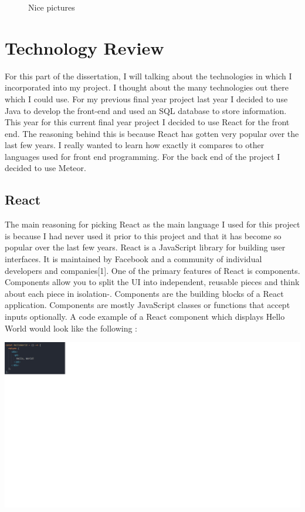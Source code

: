 \begin{figure}
  \centering
  \caption{Nice pictures}
  \label{tikz:graphs}
\end{figure}


\chapter{Technology Review}
For this part of the dissertation, I will talking about the technologies in which I incorporated into my project. I thought about the many technologies out there which I could use. For my previous final year project last year I decided to use Java to develop the front-end and used an SQL database to store information. This year for this current final year project I decided to use React for the front end. The reasoning behind this is because React has gotten very popular over the last few years. I really wanted to learn how exactly it compares to other languages used for front end programming. For the back end of the project I decided to use Meteor.


\section{React}
The main reasoning for picking React as the main language I used for this project is because I had never used it prior to this project and that it has become so popular over the last few years. React is  a JavaScript library for building user interfaces. It is maintained by Facebook and a community of individual developers and companies[1]. One of the primary features of React is components. Components allow you to split the UI into independent, reusable pieces and think about each piece in isolation-\cite{Components}. Components are the building blocks of a React application. Components are mostly JavaScript classes or functions that accept inputs optionally. A code example of a React component which displays Hello World would look like the following :
\begin{center}    
\includegraphics{img/component.png}
\end{center}

